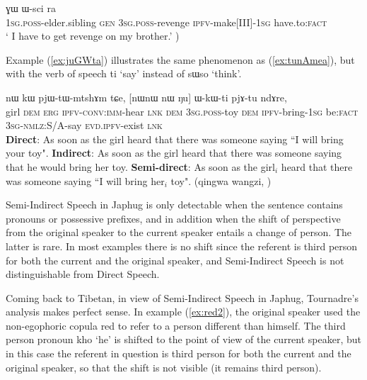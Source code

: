 \documentclass[oldfontcommands,oneside,a4paper,11pt]{article}
\newcommand{\ipa}[1]{{\phon \mbox{#1}}} %
\newcommand{\refb}[1]{(\ref{#1})}
\newcommand{\bleu}[1]{{\color{blue}#1}}
\newcommand{\rouge}[1]{{\color{red}#1}}
\begin{document}
  \begin{exe}
\ex \label{ex:tunAmea2}
\gll \bleu{\ipa{a-pi}}  	\ipa{ɣɯ}  	\ipa{ɯ-sci}  	\bleu{\ipa{tu-nɤme-a}}  	\ipa{ra}	\\
 {\textsc{1sg.poss}-elder.sibling}  \textsc{gen} \textsc{3sg.poss}-revenge {\textsc{ipfv}-make[III]-\textsc{1sg}} have.to:\textsc{fact}  \\
\glt ` I have to get revenge on my brother.' )
  \end{exe}
  
  Example \refb{ex:juGWta} illustrates the same phenomenon as \refb{ex:tunAmea}, but with the verb of speech \ipa{ti} `say' instead of \ipa{sɯso} `think'.
 
\begin{exe}
\ex \label{ex:juGWta}
\gll   \ipa{tɤɕime}  	\ipa{nɯ}  	\ipa{kɯ}  	\ipa{pjɯ-tɯ-mtshɤm}  	\ipa{tɕe,}  	[\ipa{nɯnɯ}  \rouge{\ipa{ɯ-kɯmtɕhɯ}}  	\ipa{nɯ}  	\bleu{\ipa{ju-ɣɯt-a}}  	\ipa{ŋu}]  		\ipa{ɯ-kɯ-ti}  	\ipa{pjɤ-tu}  	\ipa{ndɤre,}  \\
girl \textsc{dem} \textsc{erg} \textsc{ipfv-conv:imm}-hear \textsc{lnk} \textsc{dem} {\textsc{3sg.poss}-toy} \textsc{dem} {\textsc{ipfv}-bring-\textsc{1sg}}  be:\textsc{fact} \textsc{3sg-nmlz}:S/A-say \textsc{evd.ipfv}-exist \textsc{lnk} \\
\glt   \textbf{Direct}: As soon as the girl heard that there was someone saying ``\bleu{I will bring your toy}".
\glt   \textbf{Indirect}:  As soon as the girl heard that there was someone saying that \rouge{he would bring her toy}.
\glt   \textbf{Semi-direct}: As soon as the girl$_i$ heard that there was someone saying ``\bleu{I will bring} \rouge{her$_i$ toy}". (qingwa wangzi, )
  \end{exe}
  
Semi-Indirect Speech in Japhug is only detectable when the sentence contains pronouns or possessive prefixes, and in addition when the shift of perspective from the original speaker to the current speaker entails a change of person. The latter is rare. In most examples there is no shift since the referent is third person for both the current and the original speaker, and Semi-Indirect Speech is not distinguishable from Direct Speech.

Coming back to Tibetan, in view of Semi-Indirect Speech in Japhug, Tournadre's analysis makes perfect sense. In example \refb{ex:red2}, the original speaker used the non-egophoric copula \ipa{red} to refer to a person different than himself. The third person pronoun \ipa{kho} `he' is shifted to the point of view of the current speaker, but in this case the referent in question is third person for both the current and the original speaker, so that the shift is not visible (it remains third person).
\end{document}
